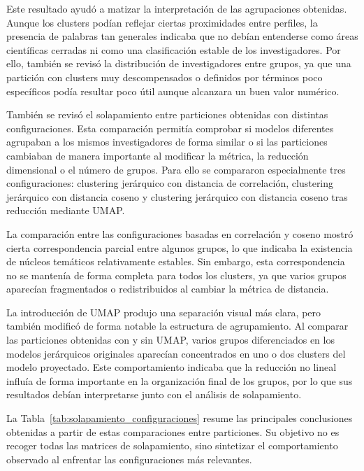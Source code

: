 \documentclass[11pt,spanish,listoffigures,listoftables]{tfgetsinf}
\begin{document}
Este resultado ayudó a matizar la interpretación de las agrupaciones obtenidas. Aunque los clusters podían reflejar ciertas proximidades entre perfiles, la presencia de palabras tan generales indicaba que no debían entenderse como áreas científicas cerradas ni como una clasificación estable de los investigadores. Por ello, también se revisó la distribución de investigadores entre grupos, ya que una partición con clusters muy descompensados o definidos por términos poco específicos podía resultar poco útil aunque alcanzara un buen valor numérico.

También se revisó el solapamiento entre particiones obtenidas con distintas configuraciones. Esta comparación permitía comprobar si modelos diferentes agrupaban a los mismos investigadores de forma similar o si las particiones cambiaban de manera importante al modificar la métrica, la reducción dimensional o el número de grupos. Para ello se compararon especialmente tres configuraciones: clustering jerárquico con distancia de correlación, clustering jerárquico con distancia coseno y clustering jerárquico con distancia coseno tras reducción mediante UMAP.

La comparación entre las configuraciones basadas en correlación y coseno mostró cierta correspondencia parcial entre algunos grupos, lo que indicaba la existencia de núcleos temáticos relativamente estables. Sin embargo, esta correspondencia no se mantenía de forma completa para todos los clusters, ya que varios grupos aparecían fragmentados o redistribuidos al cambiar la métrica de distancia.

La introducción de UMAP produjo una separación visual más clara, pero también modificó de forma notable la estructura de agrupamiento. Al comparar las particiones obtenidas con y sin UMAP, varios grupos diferenciados en los modelos jerárquicos originales aparecían concentrados en uno o dos clusters del modelo proyectado. Este comportamiento indicaba que la reducción no lineal influía de forma importante en la organización final de los grupos, por lo que sus resultados debían interpretarse junto con el análisis de solapamiento.

La Tabla~\ref{tab:solapamiento_configuraciones} resume las principales conclusiones obtenidas a partir de estas comparaciones entre particiones. Su objetivo no es recoger todas las matrices de solapamiento, sino sintetizar el comportamiento observado al enfrentar las configuraciones más relevantes.
\end{document}
